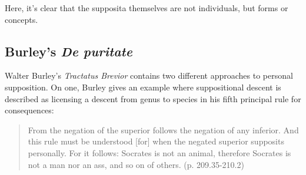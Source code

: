 \documentclass[a4paper,11pt]{article}
\begin{document}
Here, it's clear that the supposita themselves are not individuals, but forms or concepts.
\subsection{Burley's \textit{De puritate}}
Walter Burley's \textit{Tractatus Brevior} contains two different approaches to personal supposition. On one, Burley gives an example where suppositional descent is described as licensing a descent from genus to species in his fifth principal rule for consequences: 

\begin{quote}
From the negation of the superior follows the negation of any inferior. And this rule must be understood [for] when the negated superior supposits personally. For it follows: Socrates is not an animal, therefore Socrates is not a man nor an ass, and so on of others. (p. 209.35-210.2)
\end{quote} 
\end{document}
